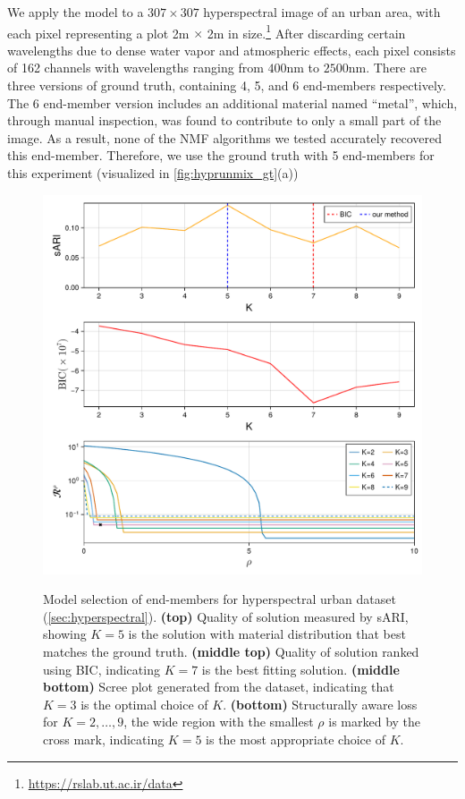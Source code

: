 We apply the model to a $307\times307$ hyperspectral image of an urban area,
with each pixel representing a plot 2m $\times$ 2m in size.\footnote{\url{https://rslab.ut.ac.ir/data}}
After discarding certain wavelengths due to dense water vapor and atmospheric effects, each pixel consists of 162 channels with wavelengths ranging from $400$nm to $2500$nm.
There are three versions of ground truth, containing 4, 5, and 6 end-members respectively.
The 6 end-member version includes an additional material named ``metal'', which, through manual inspection, was found to contribute to only a small part of the image.
As a result, none of the NMF algorithms we tested accurately recovered this end-member.
Therefore, we use the ground truth with 5 end-members for this experiment (visualized in \cref{fig:hyprunmix_gt}(a))

\begin{figure}[t!]
	\centering
	\includegraphics[width=.8\textwidth]{figures/composite-cd-urban-l2h=m1e80-shuffle-simplexh-sig=rmse-by_1e4_LInf_sparsity.pdf}
	\label{fig:urban_results_rho_k}
	\caption{
		Model selection of end-members for hyperspectral urban dataset (\cref{sec:hyperspectral}).
		\textbf{(top)} Quality of solution measured by sARI, showing $K=5$ is the solution with  material distribution that best matches the ground truth.
		\textbf{(middle top)} Quality of solution ranked using BIC, indicating $K=7$ is the best fitting solution.
        \textbf{(middle bottom)} Scree plot generated from the dataset, indicating that $K=3$ is the optimal choice of $K$.
		\textbf{(bottom)} Structurally aware loss for $K=2,\dots,9$, the wide region with the smallest $\rho$ is marked by the cross mark, indicating $K=5$ is the most appropriate choice of $K$.
	}
	\label{fig:urban_results}
\end{figure}

